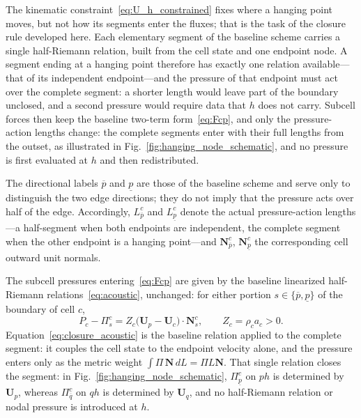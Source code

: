 \documentclass[a4paper]{cas-sc}
\begin{document}
The kinematic constraint~\eqref{eq:U_h_constrained} fixes where a hanging point moves, but not how its segments enter the fluxes; that is the task of the closure rule developed here. Each elementary segment of the baseline scheme carries a single half-Riemann relation, built from the cell state and one endpoint node. A segment ending at a hanging point therefore has exactly one relation available---that of its independent endpoint---and the pressure of that endpoint must act over the complete segment: a shorter length would leave part of the boundary unclosed, and a second pressure would require data that $h$ does not carry. Subcell forces then keep the baseline two-term form~\eqref{eq:Fcp}, and only the pressure-action lengths change: the complete segments enter with their full lengths from the outset, as illustrated in Fig.~\ref{fig:hanging_node_schematic}, and no pressure is first evaluated at $h$ and then redistributed.

The directional labels $\overline p$ and $\underline p$ are those of the baseline scheme and serve only to distinguish the two edge directions; they do not imply that the pressure acts over half of the edge. Accordingly, $L_{\overline p}^c$ and $L_{\underline p}^c$ denote the actual pressure-action lengths---a half-segment when both endpoints are independent, the complete segment when the other endpoint is a hanging point---and $\boldsymbol N_{\overline p}^c$, $\boldsymbol N_{\underline p}^c$ the corresponding cell outward unit normals.

The subcell pressures entering~\eqref{eq:Fcp} are given by the baseline linearized half-Riemann relations~\eqref{eq:acoustic}, unchanged: for either portion $s\in\{\overline p,\underline p\}$ of the boundary of cell $c$,
\begin{equation}
 P_c-\Pi_{s}^{c}=Z_c\bigl(\boldsymbol U_p-\boldsymbol U_c\bigr)\cdot\boldsymbol N_{s}^{c},
 \qquad Z_c=\rho_c a_c>0.
 \label{eq:closure_acoustic}
\end{equation}
Equation~\eqref{eq:closure_acoustic} is the baseline relation applied to the complete segment: it couples the cell state to the endpoint velocity alone, and the pressure enters only as the metric weight $\int\Pi\,\boldsymbol N\,dL=\Pi L\boldsymbol N$. That single relation closes the segment: in Fig.~\ref{fig:hanging_node_schematic}, $\Pi_{\underline p}^{c}$ on $ph$ is determined by $\boldsymbol U_p$, whereas $\Pi_{\overline q}^{c}$ on $qh$ is determined by $\boldsymbol U_q$, and no half-Riemann relation or nodal pressure is introduced at $h$.
\end{document}
